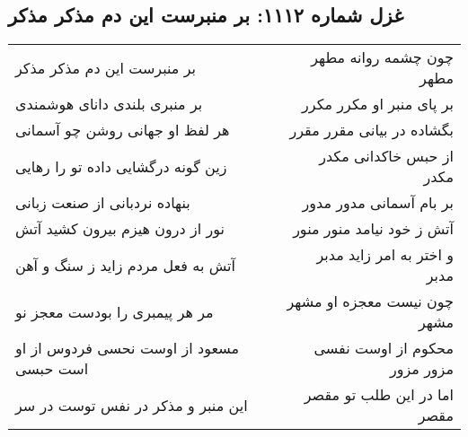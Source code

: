 \begin{center}
\section*{غزل شماره ۱۱۱۲: بر منبرست این دم مذکر مذکر}
\label{sec:1112}
\begin{longtable}{l p{0.5cm} r}
بر منبرست این دم مذکر مذکر
&&
چون چشمه روانه مطهر مطهر
\\
بر منبری بلندی دانای هوشمندی
&&
بر پای منبر او مکرر مکرر
\\
هر لفظ او جهانی روشن چو آسمانی
&&
بگشاده در بیانی مقرر مقرر
\\
زین گونه درگشایی داده تو را رهایی
&&
از حبس خاکدانی مکدر مکدر
\\
بنهاده نردبانی از صنعت زبانی
&&
بر بام آسمانی مدور مدور
\\
نور از درون هیزم بیرون کشید آتش
&&
آتش ز خود نیامد منور منور
\\
آتش به فعل مردم زاید ز سنگ و آهن
&&
و اختر به امر زاید مدبر مدبر
\\
مر هر پیمبری را بودست معجز نو
&&
چون نیست معجزه او مشهر مشهر
\\
مسعود از اوست نحسی فردوس از او است حبسی
&&
محکوم از اوست نفسی مزور مزور
\\
این منبر و مذکر در نفس توست در سر
&&
اما در این طلب تو مقصر مقصر
\\
\end{longtable}
\end{center}
